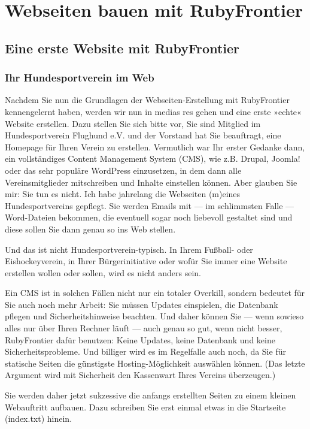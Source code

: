 \documentclass[11pt]{report}
\begin{document}
\part{Webseiten bauen mit RubyFrontier}
\label{sec-2}
\chapter{Eine erste Website mit RubyFrontier}
\label{sec-2-1}
\section{Ihr Hundesportverein im Web}
\label{sec-2-1-1}


Nachdem Sie nun die Grundlagen der Webseiten-Erstellung mit
RubyFrontier kennengelernt haben, werden wir nun in medias res gehen
und eine erste »echte« Website erstellen. Dazu stellen Sie sich bitte
vor, Sie sind Mitglied im Hundesportverein Flughund e.V. und der
Vorstand hat Sie beauftragt, eine Homepage für Ihren Verein zu
erstellen. Vermutlich war Ihr erster Gedanke dann, ein vollständiges
Content Management System (CMS), wie z.B. Drupal, Joomla! oder das
sehr populäre WordPress einzusetzen, in dem dann alle
Vereinsmitglieder mitschreiben und Inhalte einstellen können. Aber
glauben Sie mir: Sie tun es nicht. Ich habe jahrelang die Webseiten
(m)eines Hundesportvereins gepflegt. Sie werden Emails mit — im
schlimmsten Falle — Word-Dateien bekommen, die eventuell sogar noch
liebevoll gestaltet sind und diese sollen Sie dann genau so ins Web
stellen.


Und das ist nicht Hundesportverein-typisch. In Ihrem Fußball- oder
Eishockeyverein, in Ihrer Bürgerinitiative oder wofür Sie immer eine
Website erstellen wollen oder sollen, wird es nicht anders sein.


Ein CMS ist in solchen Fällen nicht nur ein totaler Overkill, sondern
bedeutet für Sie auch noch mehr Arbeit: Sie müssen Updates einspielen,
die Datenbank pflegen und Sicherheitshinweise beachten. Und daher
können Sie — wenn sowieso alles nur über Ihren Rechner läuft — auch
genau so gut, wenn nicht besser, RubyFrontier dafür benutzen: Keine
Updates, keine Datenbank und keine Sicherheitsprobleme. Und billiger
wird es im Regelfalle auch noch, da Sie für statische Seiten die
günstigste Hosting-Möglichkeit auswählen können. (Das letzte Argument
wird mit Sicherheit den Kassenwart Ihres Vereins überzeugen.)


Sie werden daher jetzt sukzessive die anfangs erstellten Seiten zu
einem kleinen Webauftritt aufbauen. Dazu schreiben Sie erst einmal
etwas in die Startseite (index.txt) hinein.
\end{document}
